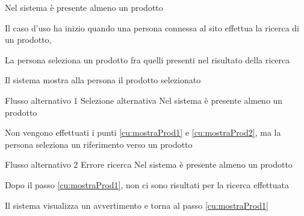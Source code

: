 \tabcuvspace


%
%

{Nel sistema è presente almeno un prodotto}
{\postNulle}
{\begin{enumCU}
	\item Il caso d'uso ha inizio quando una persona connessa al sito effettua la ricerca di un prodotto, \label{cu:mostraProd1}
	\item La persona seleziona un prodotto fra quelli presenti nel risultato della ricerca\label{cu:mostraProd2}
	\item Il sistema mostra alla persona il prodotto selezionato
\end{enumCU}}
%
{Flusso alternativo 1}%
{Selezione alternativa}%
{Nel sistema è presente almeno un prodotto}%
{\postNulle}%
{\begin{enumCU}
		\item Non vengono effettuati i punti \ref{cu:mostraProd1} e \ref{cu:mostraProd2}, ma la persona seleziona un \gls{riferimento} verso un prodotto
\end{enumCU}}%
%
{Flusso alternativo 2}%
{Errore ricerca}%
{Nel sistema è presente almeno un prodotto}%
{\postNulle}%
{\begin{enumCU}
		\item Dopo il passo \ref{cu:mostraProd1}, non ci sono risultati per la ricerca effettuata
		\item Il sistema visualizza un avvertimento e torna al passo \ref{cu:mostraProd1}
\end{enumCU}}%


